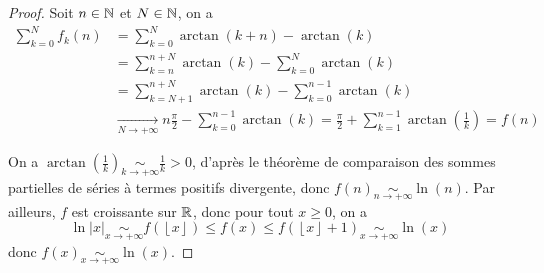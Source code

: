 \documentclass[12pt]{article}
\begin{document}
\begin{proof}
    Soit $n\in\mathbb{N}$ et $N\in\mathbb{N}$, on a 
    \begin{align}
        \sum_{k=0}^{N}f_{k}(n)
        &=\sum_{k=0}^{N}\arctan(k+n)-\arctan(k)\\
        &=\sum_{k=n}^{n+N}\arctan(k)-\sum_{k=0}^{N}\arctan(k)\\
        &=\sum_{k=N+1}^{n+N}\arctan(k)-\sum_{k=0}^{n-1}\arctan(k)\\
        &\xrightarrow[N\to+\infty]{}n\frac{\pi}{2}-\sum_{k=0}^{n-1}\arctan(k)=\frac{\pi}{2}+\sum_{k=1}^{n-1}\arctan(\frac{1}{k})=f(n)
    \end{align}

    On a $\arctan\left(\frac{1}{k}\right)\underset{k\to+\infty}{\sim}\frac{1}{k}>0$, d'après le théorème de comparaison des sommes partielles de séries à termes positifs divergente, donc $f(n)\underset{n\to+\infty}{\sim}\ln(n)$. Par ailleurs, $f$ est croissante sur $\mathbb{R}$, donc pour tout $x\geqslant0$, on a 
    \begin{equation}
        \ln\left\lvert x\right\rvert\underset{x\to+\infty}{\sim}f\left(\left\lfloor x\right\rfloor\right)\leqslant f(x)\leqslant f\left(\left\lfloor x\right\rfloor+1\right)\underset{x\to+\infty}{\sim}\ln(x)
    \end{equation}
    donc $f(x)\underset{x\to+\infty}{\sim}\ln(x)$.
\end{proof}
\end{document}

